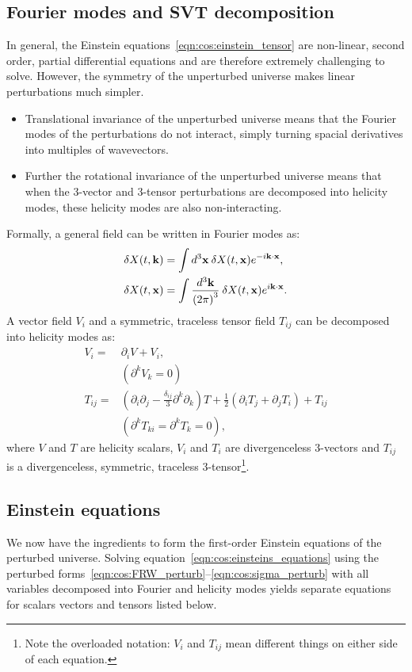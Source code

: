 \subsection{Fourier modes and SVT decomposition}
In general, the Einstein equations~\eqref{eqn:cos:einstein_tensor} are non-linear, second order, partial differential equations and are therefore extremely challenging to solve. However, the symmetry of the unperturbed universe makes linear perturbations much simpler. 
\begin{itemize}
  \item Translational invariance of the unperturbed universe means that the Fourier modes of the perturbations do not interact, simply turning spacial derivatives into multiples of wavevectors. 
  \item Further the rotational invariance of  the unperturbed universe means that when the 3-vector and 3-tensor perturbations are decomposed into helicity modes, these helicity modes are also non-interacting.
\end{itemize}
Formally, a general field can be written in Fourier modes as:
\begin{align}
  \delta X(t,\mathbf{k}) &= \int d^3\mathbf{x}\: \delta X(t,\mathbf{x}) e^{-i\mathbf{k} \cdot \mathbf{x}},\\
  \delta X(t,\mathbf{x}) &= \int \frac{d^3\mathbf{k}}{{(2\pi)}^3}\: \delta X(t,\mathbf{x}) e^{i\mathbf{k} \cdot \mathbf{x}}.
\end{align}
A vector field $V_i$ and a symmetric, traceless tensor field $T_{ij}$ can be decomposed into helicity modes as:
\begin{align}
  V_i =& \partial_i V + V_i,   \nonumber\\
  &(\partial^k V_k=0) \\
  T_{ij} =& (\partial_i\partial_j - \frac{\delta_{ij}}{3}\partial^k\partial_k)T + \frac{1}{2}(\partial_i T_j + \partial_j T_i) + T_{ij} \nonumber\\ 
  &(\partial^k T_{ki} = \partial^k T_k = 0),
\end{align}
where $V$ and $T$ are helicity scalars, $V_i$ and $T_i$ are divergenceless 3-vectors and $T_{ij}$ is a divergenceless, symmetric, traceless 3-tensor\footnote{Note the overloaded notation: $V_i$ and $T_{ij}$ mean different things on either side of each equation.}.



\subsection{Einstein equations}
We now have the ingredients to form the first-order Einstein equations of the perturbed universe. Solving equation~\eqref{eqn:cos:einsteins_equations} using the perturbed forms~\eqref{eqn:cos:FRW_perturb}--\eqref{eqn:cos:sigma_perturb} with all variables decomposed into Fourier and helicity modes yields separate equations for scalars vectors and tensors listed below.
